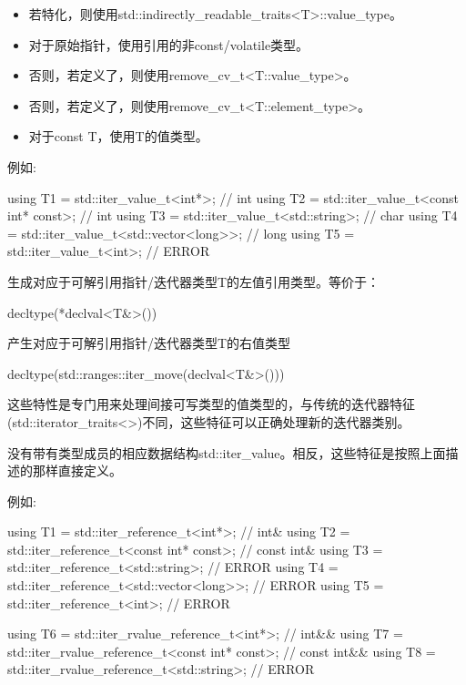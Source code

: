 \begin{itemize}
\item
若特化，则使用std::indirectly\_readable\_traits<T>::value\_type。

\item
对于原始指针，使用引用的非const/volatile类型。

\item
否则，若定义了，则使用remove\_cv\_t<T::value\_type>。

\item
否则，若定义了，则使用remove\_cv\_t<T::element\_type>。

\item
对于const T，使用T的值类型。
\end{itemize}

例如:

\begin{cpp}
using T1 = std::iter_value_t<int*>; // int
using T2 = std::iter_value_t<const int* const>; // int
using T3 = std::iter_value_t<std::string>; // char
using T4 = std::iter_value_t<std::vector<long>>; // long
using T5 = std::iter_value_t<int>; // ERROR
\end{cpp}



生成对应于可解引用指针/迭代器类型T的左值引用类型。等价于：

\begin{cpp}
decltype(*declval<T&>())
\end{cpp}


产生对应于可解引用指针/迭代器类型T的右值类型

\begin{cpp}
decltype(std::ranges::iter_move(declval<T&>()))
\end{cpp}

这些特性是专门用来处理间接可写类型的值类型的，与传统的迭代器特征(std::iterator\_traits<>)不同，这些特征可以正确处理新的迭代器类别。

没有带有类型成员的相应数据结构std::iter\_value。相反，这些特征是按照上面描述的那样直接定义。

例如:

\begin{cpp}
using T1 = std::iter_reference_t<int*>; // int&
using T2 = std::iter_reference_t<const int* const>; // const int&
using T3 = std::iter_reference_t<std::string>; // ERROR
using T4 = std::iter_reference_t<std::vector<long>>; // ERROR
using T5 = std::iter_reference_t<int>; // ERROR

using T6 = std::iter_rvalue_reference_t<int*>; // int&&
using T7 = std::iter_rvalue_reference_t<const int* const>; // const int&&
using T8 = std::iter_rvalue_reference_t<std::string>; // ERROR
\end{cpp}












